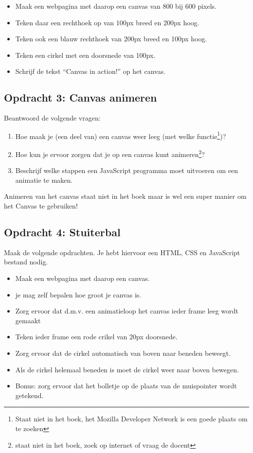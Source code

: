 \documentclass[a4paper]{report}
\begin{document}
\begin{itemize}
	\item Maak een webpagina met daarop een canvas van 800 bij 600 pixels. 
	\item Teken daar een rechthoek op van 100px breed en 200px hoog.
	\item Teken ook een blauw rechthoek van 200px breed en 100px hoog.
	\item Teken een cirkel met een doorsnede van 100px.
	\item Schrijf de tekst ``Canvas in action!'' op het canvas.
\end{itemize}

\subsection*{Opdracht 3: Canvas animeren}
Beantwoord de volgende vragen:

\begin{enumerate}
	\item Hoe maak je (een deel van) een canvas weer leeg (met welke functie\footnote{Staat niet in het boek, het Mozilla Developer Network is een goede plaats om te zoeken})?
	\item Hoe kun je ervoor zorgen dat je op een canvas kunt animeren\footnote{staat niet in het boek, zoek op internet of vraag de docent}?
	\item Beschrijf welke stappen een JavaScript programma moet uitvoeren om een animatie te maken.
\end{enumerate}

\noindent Animeren van het canvas staat niet in het boek maar is wel een super manier om het Canvas te gebruiken!

\subsection*{Opdracht 4: Stuiterbal}
Maak de volgende opdrachten. Je hebt hiervoor een HTML, CSS en JavaScript bestand nodig.

\begin{itemize}
	\item Maak een webpagina met daarop een canvas. 
	\item je mag zelf bepalen hoe groot je canvas is.
	\item Zorg ervoor dat d.m.v. een animatieloop het canvas ieder frame leeg wordt gemaakt
	\item Teken ieder frame een rode crikel van 20px doorsnede.
	\item Zorg ervoor dat de cirkel automatisch van boven naar beneden beweegt.
	\item Als de cirkel helemaal beneden is moet de cirkel weer naar boven bewegen.
	\item Bonus: zorg ervoor dat het bolletje op de plaats van de muispointer wordt getekend.
\end{itemize}
\end{document}
